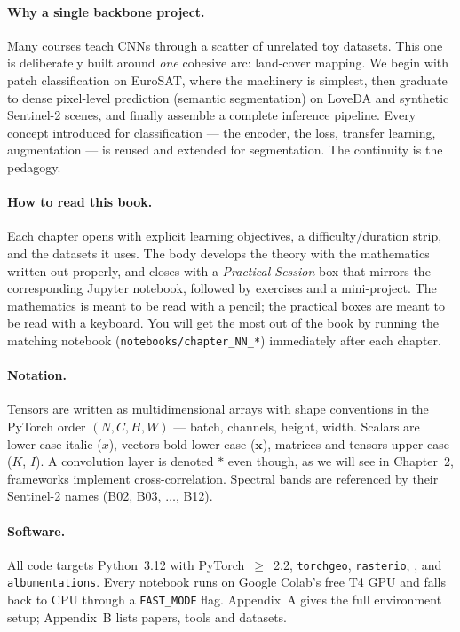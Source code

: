 \documentclass[11pt,openany]{book}
\newcommand{\nbpath}[1]{\texttt{\seqsplit{#1}}}
\theoremstyle{definition}
\begin{document}
\paragraph{Why a single backbone project.}
Many courses teach CNNs through a scatter of unrelated toy datasets. This one
is deliberately built around \emph{one} cohesive arc: land-cover mapping. We
begin with patch classification on EuroSAT, where the machinery is simplest,
then graduate to dense pixel-level prediction (semantic segmentation) on
LoveDA and synthetic Sentinel-2 scenes, and finally assemble a complete
inference pipeline. Every concept introduced for classification --- the
encoder, the loss, transfer learning, augmentation --- is reused and extended
for segmentation. The continuity is the pedagogy.

\paragraph{How to read this book.}
Each chapter opens with explicit learning objectives, a difficulty/duration
strip, and the datasets it uses. The body develops the theory with the
mathematics written out properly, and closes with a \emph{Practical Session}
box that mirrors the corresponding Jupyter notebook, followed by exercises and
a mini-project. The mathematics is meant to be read with a pencil; the
practical boxes are meant to be read with a keyboard. You will get the most
out of the book by running the matching notebook (\texttt{notebooks/chapter\_NN\_*})
immediately after each chapter.

\paragraph{Notation.}
Tensors are written as multidimensional arrays with shape conventions in the
PyTorch order $(N, C, H, W)$ --- batch, channels, height, width. Scalars are
lower-case italic ($x$), vectors bold lower-case ($\mathbf{x}$), matrices and
tensors upper-case ($K$, $I$). A convolution layer is denoted $*$ even though,
as we will see in Chapter~2, frameworks implement cross-correlation. Spectral
bands are referenced by their Sentinel-2 names (B02, B03, $\dots$, B12).

\paragraph{Software.}
All code targets Python~3.12 with PyTorch~$\geq$~2.2, \texttt{torchgeo},
\texttt{rasterio}, \nbpath{segmentation-models-pytorch}, and
\texttt{albumentations}. Every notebook runs on Google Colab's free T4 GPU and
falls back to CPU through a \texttt{FAST\_MODE} flag. Appendix~A gives the full
environment setup; Appendix~B lists papers, tools and datasets.
\end{document}

